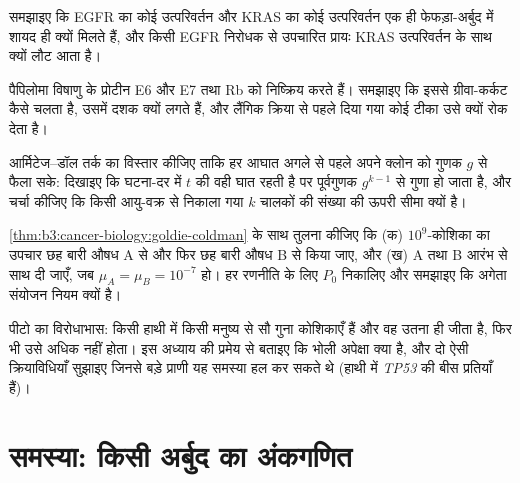 \begin{exercise}[$\star\star$]\label{exo:b3:cancer-biology:8}
समझाइए कि EGFR का कोई उत्परिवर्तन और KRAS का कोई उत्परिवर्तन एक ही
फेफड़ा-अर्बुद में शायद ही क्यों मिलते हैं, और किसी EGFR निरोधक से
उपचारित  प्रायः KRAS उत्परिवर्तन के साथ क्यों लौट आता है।
\end{exercise}

\begin{exercise}[$\star\star$]\label{exo:b3:cancer-biology:9}
पैपिलोमा विषाणु के प्रोटीन E6 और E7  तथा Rb को निष्क्रिय करते हैं।
समझाइए कि इससे ग्रीवा-कर्कट कैसे चलता है, उसमें दशक क्यों लगते हैं, और
लैंगिक क्रिया से पहले दिया गया कोई टीका उसे क्यों रोक देता है।
\end{exercise}

\begin{exercise}[$\star\star\star$]\label{exo:b3:cancer-biology:10}
आर्मिटेज--डॉल तर्क का विस्तार कीजिए ताकि हर आघात अगले से पहले अपने
क्लोन को गुणक $g$ से फैला सके: दिखाइए कि घटना-दर में $t$ की वही घात
रहती है पर पूर्वगुणक $g^{k-1}$ से गुणा हो जाता है, और चर्चा कीजिए कि
किसी आयु-वक्र से निकाला गया $k$ चालकों की संख्या की ऊपरी सीमा क्यों है।
\end{exercise}

\begin{exercise}[$\star\star\star$]\label{exo:b3:cancer-biology:11}
\cref{thm:b3:cancer-biology:goldie-coldman} के साथ तुलना कीजिए कि (क)
$10^{9}$-कोशिका  का उपचार छह बारी औषध A से और फिर छह बारी औषध B
से किया जाए, और (ख) A तथा B आरंभ से साथ दी जाएँ, जब $\mu_{A} =
\mu_{B} = 10^{-7}$ हो। हर रणनीति के लिए $P_{0}$ निकालिए और समझाइए कि
अगेता संयोजन नियम क्यों है।
\end{exercise}

\begin{exercise}[$\star\star\star$]\label{exo:b3:cancer-biology:12}
पीटो का विरोधाभास: किसी हाथी में किसी मनुष्य से सौ गुना कोशिकाएँ हैं
और वह उतना ही जीता है, फिर भी उसे अधिक  नहीं होता। इस अध्याय की
प्रमेय से बताइए कि भोली अपेक्षा क्या है, और दो ऐसी क्रियाविधियाँ
सुझाइए जिनसे बड़े प्राणी यह समस्या हल कर सकते थे (हाथी में
\emph{TP53} की बीस प्रतियाँ हैं)।
\end{exercise}

\section{समस्या: किसी अर्बुद का अंकगणित}

